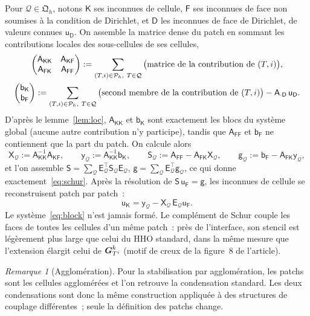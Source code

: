 \documentclass[11pt,a4paper]{article}
\theoremstyle{definition}
\theoremstyle{remark}
\newtheorem{remark}{Remarque}
\newcommand{\patch}{\mathcal{Q}}
\newcommand{\patches}{\mathfrak{Q}_h}
\newcommand{\Kp}{\mathsf{K}}
\newcommand{\Fp}{\mathsf{F}}
\newcommand{\A}{\mathsf{A}}
\newcommand{\B}{\mathsf{b}}
\newcommand{\Sm}{\mathsf{S}}
\begin{document}
Pour $\patch\in\patches$, notons $\Kp$ ses inconnues de cellule, $\Fp$ ses inconnues de face non
soumises à la condition de Dirichlet, et $\mathsf{D}$ les inconnues de face de Dirichlet, de valeurs
connues $\mathsf{u}_\mathsf{D}$. On assemble la matrice dense du patch en sommant les contributions
locales des sous-cellules de ses cellules,
\begin{gather*}
\begin{pmatrix} \A_{\Kp\Kp} & \A_{\Kp\Fp} \\ \A_{\Fp\Kp} & \A_{\Fp\Fp}\end{pmatrix}
:=\sum_{(T,i)\in\pmesh,\ T\in\patch}\big(\text{matrice de la contribution de }(T,i)\big),\\
\begin{pmatrix} \B_{\Kp} \\ \B_{\Fp}\end{pmatrix} := \sum_{(T,i)\in\pmesh,\ T\in\patch} \big(\text{second membre de la contribution de }(T,i)\big)
- \A_{\cdot\mathsf{D}}\,\mathsf{u}_\mathsf{D}.
\end{gather*}
D'après le lemme~\ref{lem:loc}, $\A_{\Kp\Kp}$ et $\B_\Kp$ sont exactement les blocs du système global
(aucune autre contribution n'y participe), tandis que $\A_{\Fp\Fp}$ et $\B_\Fp$ ne contiennent que la
part du patch. On calcule alors
\[
\mathsf{X}_\patch:=\A_{\Kp\Kp}^{-1}\A_{\Kp\Fp},\qquad \mathsf{y}_\patch:=\A_{\Kp\Kp}^{-1}\B_\Kp,
\qquad
\Sm_\patch:=\A_{\Fp\Fp}-\A_{\Fp\Kp}\mathsf{X}_\patch,\qquad \mathsf{g}_\patch:=\B_\Fp-\A_{\Fp\Kp}\mathsf{y}_\patch,
\]
et l'on assemble $\Sm=\sum_\patch \mathsf{E}_\patch^\top\Sm_\patch\mathsf{E}_\patch$,
$\mathsf{g}=\sum_\patch\mathsf{E}_\patch^\top\mathsf{g}_\patch$, ce qui donne exactement~\eqref{eq:schur}.
Après la résolution de $\Sm\,\mathsf{u}_\mathsf{F}=\mathsf{g}$, les inconnues de cellule se
reconstruisent patch par patch~:
\[
\mathsf{u}_\Kp=\mathsf{y}_\patch-\mathsf{X}_\patch\,\mathsf{E}_\patch\mathsf{u}_\mathsf{F}.
\]
Le système~\eqref{eq:block} n'est jamais formé. Le complément de Schur couple les faces de toutes les
cellules d'un même patch~: près de l'interface, son stencil est légèrement plus large que celui du
HHO standard, dans la même mesure que l'extension élargit celui de $\boldsymbol{G}_{T^i}^k$
(motif de creux de la figure~8 de l'article).

\begin{remark}[Agglomération]
Pour la stabilisation par agglomération, les patchs sont les cellules agglomérées et l'on retrouve
la condensation standard. Les deux condensations sont donc la même construction appliquée à des
structures de couplage différentes~; seule la définition des patchs change.
\end{remark}
\end{document}
